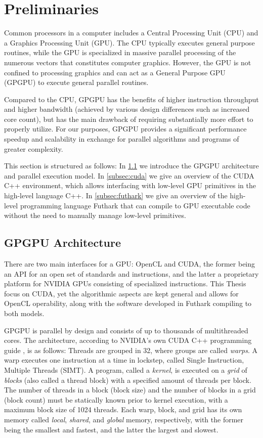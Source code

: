 \section{Preliminaries}
\label{sec:pre}
Common processors in a computer includes a Central Processing Unit (CPU) and a
Graphics Processing Unit (GPU). The CPU typically executes general purpose
routines, while the GPU is specialized in massive parallel processing of the
numerous vectors that constitutes computer graphics. However, the GPU is not
confined to processing graphics and can act as a General Purpose GPU (GPGPU) to
execute general parallel routines.

Compared to the CPU, GPGPU has the benefits of higher instruction throughput and
higher bandwidth (achieved by various design differences such as increased core
count), but has the main drawback of requiring substantially more effort to
properly utilize. For our purposes, GPGPU provides a significant performance
speedup and scalability in exchange for parallel algorithms and programs of
greater complexity.

This section is structured as follows: In \ref{subsec:gpgpu} we introduce the
GPGPU architecture and parallel execution model. In \ref{subsec:cuda} we give an
overview of the CUDA C++ environment, which allows interfacing with low-level
GPU primitives in the high-level language C++. In \ref{subsec:futhark} we give
an overview of the high-level programming language Futhark that can compile to
GPU executable code without the need to manually manage low-level primitives.

\subsection{GPGPU Architecture}
\label{subsec:gpgpu}

There are two main interfaces for a GPU: OpenCL and CUDA, the former being an
API for an open set of standards and instructions, and the latter a proprietary
platform for NVIDIA GPUs consisting of specialized instructions. This Thesis
focus on CUDA, yet the algorithmic aspects are kept general and allows for
OpenCL operability, along with the software developed in Futhark compiling to
both models.

GPGPU is parallel by design and consists of up to thousands of multithreaded
cores. The architecture, according to NVIDIA's own CUDA C++ programming guide
\cite{cudaguide}, is as follows: Threads are grouped in 32, where groups are
called \textit{warps}. A warp executes one instruction at a time in lockstep,
called Single Instruction, Multiple Threads (SIMT). A program, called a
\textit{kernel}, is executed on a \textit{grid} of \textit{blocks} (also called
a thread block) with a specified amount of threads per block. The number of
threads in a block (block size) and the number of blocks in a grid (block count)
must be statically known prior to kernel execution, with a maximum block size of
1024 threads. Each warp, block, and grid has its own memory called
\textit{local}, \textit{shared}, and \textit{global} memory, respectively, with
the former being the smallest and fastest, and the latter the largest and
slowest.

